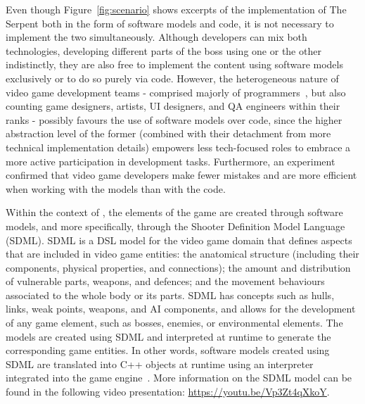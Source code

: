 Even though Figure~\ref{fig:scenario} shows excerpts of the implementation of The Serpent both in the form of software models and code, it is not necessary to implement the two simultaneously. Although developers can mix both technologies, developing different parts of the boss using one or the other indistinctly, they are also free to implement the content using software models exclusively or to do so purely via code. However, the heterogeneous nature of video game development teams - comprised majorly of programmers~\cite{devNation}, but also counting game designers, artists, UI designers, and QA engineers within their ranks - possibly favours the use of software models over code, since the higher abstraction level of the former (combined with their detachment from more technical implementation details) empowers less tech-focused roles to embrace a more active participation in development tasks. Furthermore, an experiment~\cite{domingo2020evaluating} confirmed that video game developers make fewer mistakes and are more efficient when working with the models than with the code.

Within the context of \CaseStudy{}, the elements of the game are created through software models, and more specifically, through the Shooter Definition Model Language (SDML). SDML is a DSL model for the video game domain that defines aspects that are included in video game entities: the anatomical structure (including their components, physical properties, and connections); the amount and distribution of vulnerable parts, weapons, and defences; and the movement behaviours associated to the whole body or its parts. SDML has concepts such as hulls, links, weak points, weapons, and AI components, and allows for the development of any game element, such as bosses, enemies, or environmental elements. The models are created using SDML and interpreted at runtime to generate the corresponding game entities. In other words, software models created using SDML are translated into C++ objects at runtime using an interpreter integrated into the game engine~\cite{blasco2021evolutionary}. More information on the SDML model can be found in the following video presentation: \url{https://youtu.be/Vp3Zt4qXkoY}.

